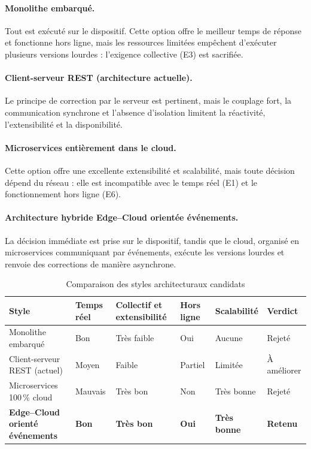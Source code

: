\documentclass[11pt,a4paper]{report}
\begin{document}
\paragraph{Monolithe embarqué.} Tout est exécuté sur le dispositif. Cette option offre le meilleur temps de réponse et fonctionne hors ligne, mais les ressources limitées empêchent d'exécuter plusieurs versions lourdes : l'exigence collective (E3) est sacrifiée.

\paragraph{Client-serveur REST (architecture actuelle).} Le principe de correction par le serveur est pertinent, mais le couplage fort, la communication synchrone et l'absence d'isolation limitent la réactivité, l'extensibilité et la disponibilité.

\paragraph{Microservices entièrement dans le cloud.} Cette option offre une excellente extensibilité et scalabilité, mais toute décision dépend du réseau : elle est incompatible avec le temps réel (E1) et le fonctionnement hors ligne (E6).

\paragraph{Architecture hybride Edge--Cloud orientée événements.} La décision immédiate est prise sur le dispositif, tandis que le cloud, organisé en microservices communiquant par événements, exécute les versions lourdes et renvoie des corrections de manière asynchrone.

\begin{table}[H]
\centering
\caption{Comparaison des styles architecturaux candidats}
\label{tab:comparaison}
\begin{tabularx}{\textwidth}{>{\raggedright\arraybackslash}p{3.4cm} L L L L l}
\toprule
{}\textbf{Style} & \textbf{Temps réel} & \textbf{Collectif et extensibilité} & \textbf{Hors ligne} & \textbf{Scalabilité} & \textbf{Verdict}\\
\midrule
Monolithe embarqué & Bon & Très faible & Oui & Aucune & Rejeté\\
Client-serveur REST (actuel) & Moyen & Faible & Partiel & Limitée & À améliorer\\
Microservices 100\,\% cloud & Mauvais & Très bon & Non & Très bonne & Rejeté\\
\textbf{Edge--Cloud orienté événements} & \textbf{Bon} & \textbf{Très bon} & \textbf{Oui} & \textbf{Très bonne} & \textbf{Retenu}\\
\bottomrule
\end{tabularx}
\end{table}
\end{document}

